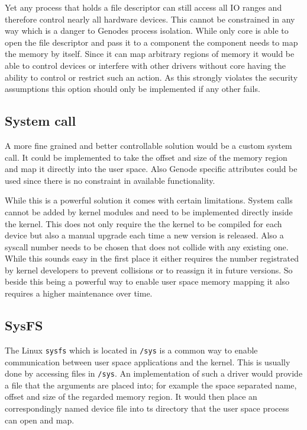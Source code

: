 \documentclass[
a4paper,
12pt,
notitlepage,
parskip=half,
DIV=11,
]{scrbook}
\begin{document}
		Yet any process that holds a file descriptor can still access all IO ranges and therefore control nearly all hardware devices.
		This cannot be constrained in any way which is a danger to Genodes process isolation.
		While only core is able to open the file descriptor and pass it to a component the component needs to map the memory by itself.
		Since it can map arbitrary regions of memory it would be able to control devices or interfere with other drivers without core having the ability to control or restrict such an action.
		As this strongly violates the security assumptions this option should only be implemented if any other fails. \citep{devmem} 
		
		\subsection{System call}
		
		A more fine grained and better controllable solution would be a custom system call.
		It could be implemented to take the offset and size of the memory region and map it directly into the user space.
		Also Genode specific attributes could be used since there is no constraint in available functionality.
		
		While this is a powerful solution it comes with certain limitations.
		System calls cannot be added by kernel modules and need to be implemented directly inside the kernel.
		This does not only require the the kernel to be compiled for each device but also a manual upgrade each time a new version is released.
		Also a syscall number needs to be chosen that does not collide with any existing one.
		While this sounds easy in the first place it either requires the number registrated by kernel developers to prevent collisions or to reassign it in future versions.
		So beside this being a powerful way to enable user space memory mapping it also requires a higher maintenance over time. \citep{syscall}
		
		\subsection{SysFS}
		
		The Linux \texttt{sysfs} which is located in \texttt{/sys} is a common way to enable communication between user space applications and the kernel.
		This is usually done by accessing files in \texttt{/sys}.
		An implementation of such a driver would provide a file that the arguments are placed into; for example the space separated name, offset and size of the regarded memory region.
		It would then place an correspondingly named device file into ts directory that the user space process can open and map. \citep{sysfs}
		
\end{document}
